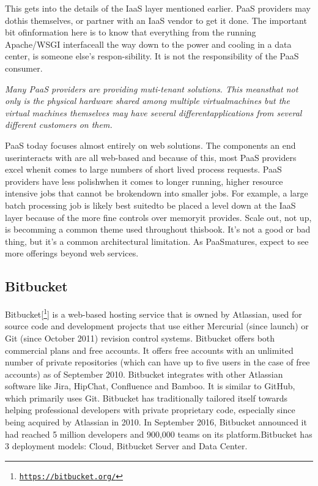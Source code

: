 This gets into the details of the IaaS layer mentioned earlier. PaaS providers may dothis themselves, or partner with an IaaS vendor to get it done. The important bit ofinformation here is to know that everything from the running Apache/WSGI interfaceall the way down to the power and cooling in a data center, is someone else’s respon-sibility. It is not the responsibility of the PaaS consumer.
\newline

\textit{Many PaaS providers are providing muti-tenant solutions. This meansthat not only is the physical hardware shared among multiple virtualmachines but the virtual machines themselves may have several differentapplications from several different customers on them.}
\newline

PaaS today focuses almost entirely on web solutions. The components an end userinteracts with are all web-based and because of this, most PaaS providers excel whenit comes to large numbers of short lived process requests. PaaS providers have less polishwhen it comes to longer running, higher resource intensive jobs that cannot be brokendown into smaller jobs. For example, a large batch processing job is likely best suitedto be placed a level down at the IaaS layer because of the more fine controls over memoryit provides. Scale out, not up, is becomming a common theme used throughout thisbook. It’s not a good or bad thing, but it’s a common architectural limitation. As PaaSmatures, expect to see more offerings beyond web services.

\subsection{Bitbucket}
Bitbucket[\footnote{\href{https://bitbucket.org/}{\texttt{https://bitbucket.org/}}}] is a web-based hosting service that is owned by Atlassian, used for source code and development projects that use either Mercurial (since launch) or Git (since October 2011) revision control systems. Bitbucket offers both commercial plans and free accounts. It offers free accounts with an unlimited number of private repositories (which can have up to five users in the case of free accounts) as of September 2010. Bitbucket integrates with other Atlassian software like Jira, HipChat, Confluence and Bamboo.
It is similar to GitHub, which primarily uses Git. Bitbucket has traditionally tailored itself towards helping professional developers with private proprietary code, especially since being acquired by Atlassian in 2010. In September 2016, Bitbucket announced it had reached 5 million developers and 900,000 teams on its platform.Bitbucket has 3 deployment models: Cloud, Bitbucket Server and Data Center.
